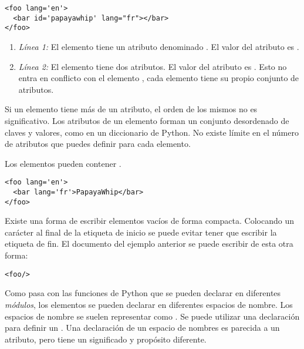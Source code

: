 \noindent\begin{minipage}{\textwidth}
\begin{lstlisting}[mathescape=True]
<foo lang='en'>
  <bar id='papayawhip' lang="fr"></bar>
</foo>
\end{lstlisting}
\end{minipage}

\begin{enumerate}

\item \emph{Línea 1:} El elemento  tiene un atributo denominado . El valor del atributo  es .

\item \emph{Línea 2:} El elemento  tiene dos atributos. El valor del atributo  es . Esto no entra en conflicto con el elemento , cada elemento tiene su propio conjunto de atributos.

\end{enumerate}

Si un elemento tiene más de un atributo, el orden de los mismos no es significativo. Los atributos de un elemento forman un conjunto desordenado de claves y valores, como en un diccionario de Python. No existe límite en el número de atributos que puedes definir para cada elemento.

Los elementos pueden contener .

\noindent\begin{minipage}{\textwidth}
\begin{lstlisting}[mathescape=True]
<foo lang='en'>
  <bar lang='fr'>PapayaWhip</bar>
</foo>
\end{lstlisting}
\end{minipage}

Existe una forma de escribir elementos vacíos de forma compacta. Colocando un carácter \codigo{/} al final de la etiqueta de inicio se puede evitar tener que escribir la etiqueta de fin. El documento  del ejemplo anterior se puede escribir de esta otra forma:

\noindent\begin{minipage}{\textwidth}
\begin{lstlisting}[mathescape=True]
<foo/>
\end{lstlisting}
\end{minipage}

Como pasa con las funciones de Python que se pueden declarar en diferentes \emph{módulos}, los elementos  se pueden declarar en diferentes espacios de nombre. Los espacios de nombre se suelen representar como . Se puede utilizar una declaración  para definir un . Una declaración de un espacio de nombres es parecida a un atributo, pero tiene un significado y propósito diferente.

